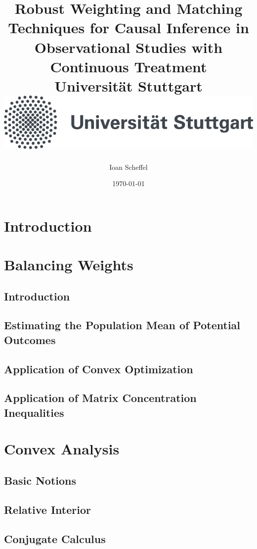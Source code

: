 \documentclass[12pt]{scrreport}
\title{
  {
    Robust Weighting and Matching Techniques for Causal Inference in Observational Studies with Continuous Treatment
  }
  \\
  {\large Universität Stuttgart}
  \\
  {\includegraphics{unistuttgart_logo_deutsch.jpg}}
}
\author{Ioan Scheffel}
\date{\today}
\begin{document}
\maketitle

\tableofcontents 

\chapter{Introduction}
%

\chapter{Balancing Weights}
  \section{Introduction}
  \section{Estimating the Population Mean of Potential Outcomes}
  \section{Application of Convex Optimization}
  
  \section{Application of Matrix Concentration Inequalities}


\chapter{Convex Analysis}
  \section{Basic Notions}
  \section{Relative Interior}
  \section{Conjugate Calculus}
%
\end{document}
